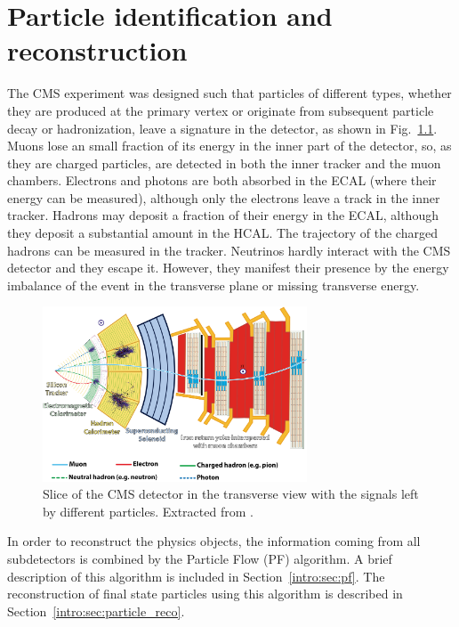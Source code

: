 \documentclass[../main.tex]{subfiles}
\begin{document}
\chapter{Particle identification and reconstruction}
\label{intro:sec:id}

The CMS experiment was designed such that particles of different types, whether they are produced at the primary vertex or originate from subsequent particle decay or hadronization, leave a signature in the detector, as shown in Fig.~\ref{intro:fig:cms_slice}. Muons lose an small fraction of its energy in the inner part of the detector, so, as they are charged particles, are detected in both the inner tracker and the muon chambers. Electrons and photons are both absorbed in the ECAL (where their energy can be measured), although only the electrons leave a track in the inner tracker. Hadrons may deposit a fraction of their energy in the ECAL, although they deposit a substantial amount in the HCAL. The trajectory of the charged hadrons can be measured in the tracker. Neutrinos hardly interact with the CMS detector and they escape it. However, they manifest their presence by the energy imbalance of the event in the transverse plane or missing transverse energy.

\begin{figure}[h!]
\begin{center}

\includegraphics[width=0.7\textwidth]{Images/CMSslice_whiteBackground}
\end{center}
\caption[Particle signature inside CMS]{Slice of the CMS detector in the transverse view with the signals left by different particles. Extracted from \cite{hh:intro:cms_slice}.}
\label{intro:fig:cms_slice}
\end{figure}

In order to reconstruct the physics objects, the information coming from all subdetectors is combined by the Particle Flow (PF) \cite{intro:id:pf} algorithm. A brief description of this algorithm is included in Section~\ref{intro:sec:pf}. The reconstruction of final state particles using this algorithm is described in Section~\ref{intro:sec:particle_reco}.
\end{document}
